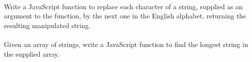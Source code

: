 \documentclass[10pt, a4paper]{article}
\begin{document}
\paragraph{} Write a JavaScript function to replace each character of a string, supplied as an argument to the function, by the next one in the English alphabet, returning the resulting manipulated string.


\paragraph{} Given an array of strings, write a JavaScript function to find the longest string in the supplied array.



\end{document}
